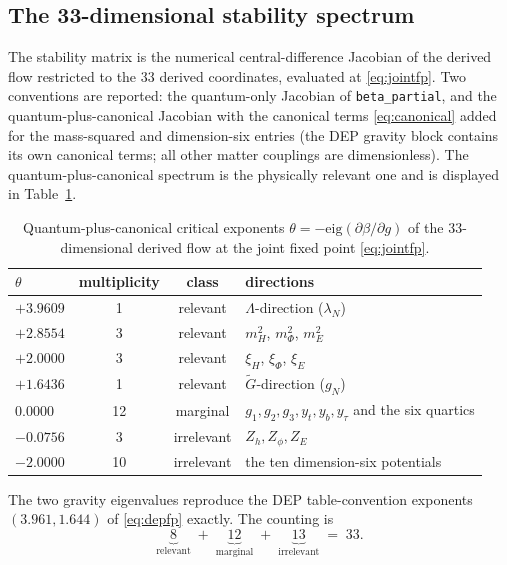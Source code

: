 \documentclass[11pt]{article}
\begin{document}
\subsection{The 33-dimensional stability spectrum}
\label{sec:spectrum}

The stability matrix is the numerical central-difference Jacobian of the
derived flow restricted to the 33 derived coordinates, evaluated at
\eqref{eq:jointfp}.  Two conventions are reported: the quantum-only
Jacobian of \texttt{beta\_partial}, and the quantum-plus-canonical Jacobian
with the canonical terms \eqref{eq:canonical} added for the mass-squared and
dimension-six entries (the DEP gravity block contains its own canonical
terms; all other matter couplings are dimensionless).  The
quantum-plus-canonical spectrum is the physically relevant one and is
displayed in Table~\ref{tab:spectrum}.

\begin{table}[htbp]
  \centering
  \caption{Quantum-plus-canonical critical exponents
  $\theta=-\mathrm{eig}(\partial\beta/\partial g)$ of the 33-dimensional
  derived flow at the joint fixed point \eqref{eq:jointfp}.}
  \label{tab:spectrum}
  \begin{tabular}{lcc l}
    \toprule
    $\theta$ & multiplicity & class & directions \\
    \midrule
    $+3.9609$   & 1 & relevant & $\Lambda$-direction ($\lambda_N$) \\
    $+2.8554$   & 3 & relevant & $m_H^2$, $m_\Phi^2$, $m_E^2$ \\
    $+2.0000$   & 3 & relevant & $\xi_H$, $\xi_\Phi$, $\xi_E$ \\
    $+1.6436$   & 1 & relevant & $\tilde G$-direction ($g_N$) \\
    $0.0000$    & 12 & marginal & $g_1,g_2,g_3,y_t,y_b,y_\tau$ and the six quartics \\
    $-0.0756$   & 3 & irrelevant & $Z_h,Z_\phi,Z_E$ \\
    $-2.0000$   & 10 & irrelevant & the ten dimension-six potentials \\
    \bottomrule
  \end{tabular}
\end{table}

The two gravity eigenvalues reproduce the DEP table-convention exponents
$(3.961,1.644)$ of \eqref{eq:depfp} exactly.  The counting is
\begin{equation}
  \label{eq:counting}
  \underbrace{8}_{\text{relevant}}\;+\;
  \underbrace{12}_{\text{marginal}}\;+\;
  \underbrace{13}_{\text{irrelevant}}\;=\;33 .
\end{equation}
\end{document}
